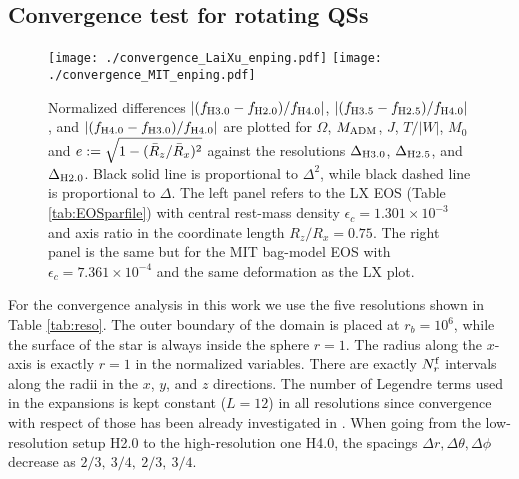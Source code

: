 \documentclass[twocolumn,superscriptaddress,showpacs,prd,aps,amsmath,amssymb,nofootinbib]{revtex4-1}
\begin{document}
\subsection{Convergence test for rotating QSs}

\begin{figure*}
\begin{center}
\texttt{[image: ./convergence\_LaiXu\_enping.pdf]}
%
\texttt{[image: ./convergence\_MIT\_enping.pdf]}
\end{center}
\caption{Normalized differences $|(f_{{\rm H}3.0} - f_{{\rm
      H}2.0})/f_{{\rm H}4.0}|$, $|(f_{{\rm H}3.5} - f_{{\rm
      H}2.5})/f_{{\rm H}4.0}|$, and $|(f_{{\rm H}4.0} - f_{{\rm
      H}3.0})/f_{{\rm H}4.0}|$ are plotted for $\Omega$, $M_{\rm ADM}$, $J$,
  $T/|W|$, $M_0$ and $e:=\sqrt{1-({\bar R}_z/{\bar R}_x)^2}$ against the
  resolutions $\Delta_{{\rm H}3.0}$, $\Delta_{{\rm H}2.5}$, and
  $\Delta_{{\rm H}2.0}$.  Black solid line is proportional to $\Delta^2$,
  while black dashed line is proportional to
  $\Delta$. The left panel refers to the LX EOS (Table
  \ref{tab:EOSparfile}) with central rest-mass density $\epsilon_c=1.301
  \times 10^{-3}$ and axis ratio in the coordinate length $R_z/R_x =
  0.75$.  The right panel is the same but for the MIT bag-model EOS with
  $\epsilon_c=7.361\times10^{-4}$ and the same deformation as the LX
  plot. }
\label{fig:convtest_RQS}
\end{figure*}


For the convergence analysis in this work we use the five resolutions
shown in Table \ref{tab:reso}. The outer boundary of the domain is placed
at $r_b=10^6$, while the surface of the star is always inside the sphere
$r=1$. The radius along the $x$-axis is exactly $r=1$ in the normalized
variables. There are exactly ${N_r^{\rm f}}$ intervals along the radii in the $x$,
$y$, and $z$ directions. The number of Legendre terms used in the
expansions is kept constant ($L=12$) in all resolutions since convergence
with respect of those has been already investigated in
\cite{Tsokaros2007}. When going from the low-resolution setup H2.0 to the
high-resolution one H4.0, the spacings $\Delta r,\Delta\theta,
\Delta\phi$ decrease as $2/3,\ 3/4,\ 2/3,\ 3/4$.
\end{document}
